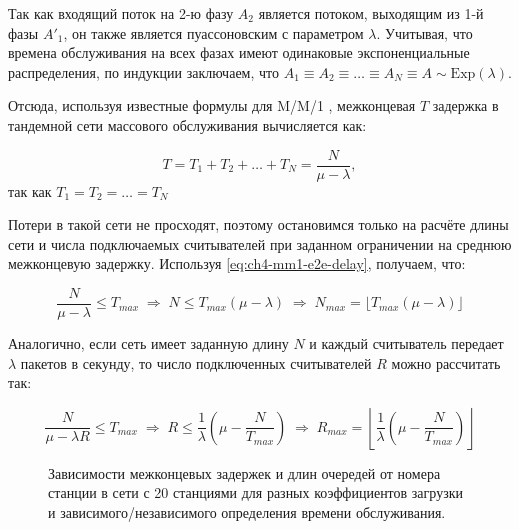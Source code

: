 Так как входящий поток на 2-ю фазу $A_2$ является потоком, выходящим из 1-й фазы $A'_1$, он также является пуассоновским с параметром $\lambda$. Учитывая, что времена обслуживания на всех фазах имеют одинаковые экспоненциальные распределения, по индукции заключаем, что $A_1 \equiv A_2 \equiv \dots \equiv A_N \equiv A \sim \text{Exp}(\lambda)$.

Отсюда, используя известные формулы для M/M/1 \cite{Kleinrock1979}, межконцевая $T$ задержка в тандемной сети массового обслуживания вычисляется как:

\begin{equation}
	\label{eq:ch4-mm1-e2e-delay}
	T = T_1 + T_2 + \dots + T_N = \frac{N}{\mu - \lambda},
\end{equation}
так как $T_1 = T_2 = \dots = T_N$

Потери в такой сети не просходят, поэтому остановимся только на расчёте длины сети и числа подключаемых считывателей при заданном ограничении на среднюю межконцевую задержку. Используя \eqref{eq:ch4-mm1-e2e-delay}, получаем, что:

\begin{equation}
	\label{eq:ch4-mm1-length}
	\frac{N}{\mu - \lambda} \leqslant T_{max} \; \Rightarrow \; N \leqslant T_{max}(\mu - \lambda) \; \Rightarrow \; N_{max} = \lfloor T_{max}(\mu - \lambda) \rfloor
\end{equation}

Аналогично, если сеть имеет заданную длину $N$ и каждый считыватель передает $\lambda$ пакетов в секунду, то число подключенных считывателей $R$ можно рассчитать так:

\begin{equation}
	\label{eq:ch4-mm1-num}
	\frac{N}{\mu - \lambda R} \leqslant T_{max} \; \Rightarrow \; R \leqslant \frac{1}{\lambda}(\mu - \frac{N}{T_{max}}) \; \Rightarrow \; R_{max} = \left\lfloor \frac{1}{\lambda}(\mu - \frac{N}{T_{max}}) \right\rfloor
\end{equation}

\begin{figure}[htb]
  \caption{Зависимости межконцевых задержек и длин очередей от номера станции в сети с 20 станциями для разных коэффициентов загрузки и зависимого/независимого определения времени обслуживания.}
  \label{fig:ch4_mm1_delays}
\end{figure}

